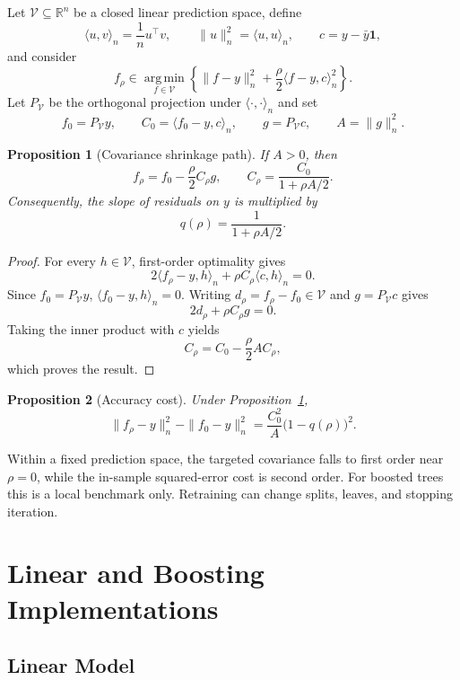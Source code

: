\documentclass[10pt]{article}
\newtheorem{proposition}{Proposition}
\theoremstyle{definition}
\newcommand{\R}{\mathbb{R}}
\newcommand{\1}{\mathbf{1}}
\newcommand{\Vcal}{\mathcal{V}}
\newcommand{\argminop}{\operatorname*{arg\,min}}
\begin{document}
Let $\Vcal\subseteq\R^n$ be a closed linear prediction space, define
\[
\langle u,v\rangle_n=\frac{1}{n}u^\top v,
\qquad
\|u\|_n^2=\langle u,u\rangle_n,
\qquad
c=y-\bar y\1,
\]
and consider
\begin{equation}
\label{eq:path_problem}
f_\rho\in\argminop_{f\in\Vcal}
\left\{
\|f-y\|_n^2
+\frac{\rho}{2}\langle f-y,c\rangle_n^2
\right\}.
\end{equation}
Let $P_{\Vcal}$ be the orthogonal projection under $\langle\cdot,\cdot\rangle_n$ and set
\[
f_0=P_{\Vcal}y,\qquad
C_0=\langle f_0-y,c\rangle_n,\qquad
g=P_{\Vcal}c,\qquad
A=\|g\|_n^2.
\]

\begin{proposition}[Covariance shrinkage path]
\label{prop:path}
If $A>0$, then
\[
f_\rho=f_0-\frac{\rho}{2}C_\rho g,
\qquad
C_\rho=\frac{C_0}{1+\rho A/2}.
\]
Consequently, the slope of residuals on $y$ is multiplied by
\[
q(\rho)=\frac{1}{1+\rho A/2}.
\]
\end{proposition}

\begin{proof}
For every $h\in\Vcal$, first-order optimality gives
\[
2\langle f_\rho-y,h\rangle_n
+\rho C_\rho\langle c,h\rangle_n=0.
\]
Since $f_0=P_{\Vcal}y$, $\langle f_0-y,h\rangle_n=0$. Writing
$d_\rho=f_\rho-f_0\in\Vcal$ and $g=P_{\Vcal}c$ gives
\[
2d_\rho+\rho C_\rho g=0.
\]
Taking the inner product with $c$ yields
\[
C_\rho=C_0-\frac{\rho}{2}AC_\rho,
\]
which proves the result.
\end{proof}

\begin{proposition}[Accuracy cost]
\label{prop:path_cost}
Under Proposition~\ref{prop:path},
\[
\|f_\rho-y\|_n^2-\|f_0-y\|_n^2
=
\frac{C_0^2}{A}\bigl(1-q(\rho)\bigr)^2.
\]
\end{proposition}

Within a fixed prediction space, the targeted covariance falls to first order near $\rho=0$, while the in-sample squared-error cost is second order. For boosted trees this is a local benchmark only. Retraining can change splits, leaves, and stopping iteration.

\section{Linear and Boosting Implementations}
\label{app:implementation}


\subsection{Linear Model}
\end{document}
